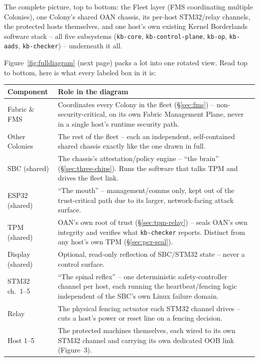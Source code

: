 \documentclass[11pt,a4paper]{article}
\begin{document}
The complete picture, top to bottom: the Fleet layer (FMS coordinating
multiple Colonies), one Colony's shared OAN chassis, its per-host
STM32/relay channels, the protected hosts themselves, and one host's
own existing Kernel Borderlands software stack -- all five subsystems
(\texttt{kb-core}, \texttt{kb-control-plane}, \texttt{kb-op},
\texttt{kb-aads}, \texttt{kb-checker}) -- underneath it all.

Figure~\ref{fig:fulldiagram} (next page) packs a lot into one rotated
view. Read top to bottom, here is what every labeled box in it is:

\begin{center}
\renewcommand{\arraystretch}{1.35}
\small
\begin{tabular}{@{}p{3.6cm}p{10.6cm}@{}}
\toprule
\textbf{Component} & \textbf{Role in the diagram} \\
\midrule
Fabric \& FMS & Coordinates every Colony in the fleet (\S\ref{sec:fms}) -- non-security-critical, on its own Fabric Management Plane, never in a single host's runtime security path. \\
Other Colonies & The rest of the fleet -- each an independent, self-contained shared chassis exactly like the one drawn in full. \\
SBC (shared) & The chassis's attestation/policy engine -- ``the brain'' (\S\ref{sec:three-chips}). Runs the software that talks TPM and drives the fleet link. \\
ESP32 (shared) & ``The mouth'' -- management/comms only, kept out of the trust-critical path due to its larger, network-facing attack surface. \\
TPM (shared) & OAN's own root of trust (\S\ref{sec:tpm-relay}) -- seals OAN's own integrity and verifies what \texttt{kb-checker} reports. Distinct from any host's own TPM (\S\ref{sec:pcr-seal}). \\
Display (shared) & Optional, read-only reflection of SBC/STM32 state -- never a control surface. \\
STM32 ch.~1--5 & ``The spinal reflex'' -- one deterministic safety-controller channel per host, each running the heartbeat/fencing logic independent of the SBC's own Linux failure domain. \\
Relay & The physical fencing actuator each STM32 channel drives -- cuts a host's power or reset line on a fencing decision. \\
Host 1--5 & The protected machines themselves, each wired to its own STM32 channel and carrying its own dedicated OOB link (Figure~3). \\

\end{tabular}
\end{center}
\end{document}
